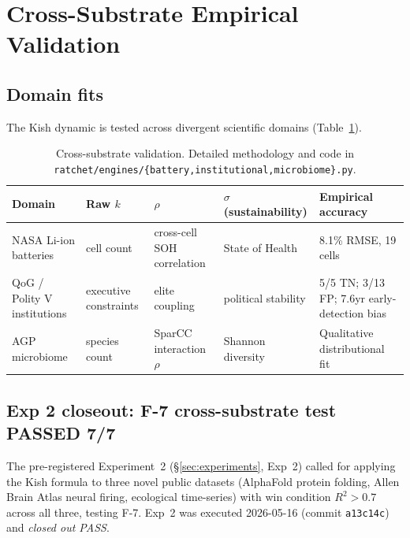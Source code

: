 \documentclass[11pt,a4paper]{article}
\begin{document}
\section{Cross-Substrate Empirical Validation}
\label{sec:substrate}

\subsection{Domain fits}
The Kish dynamic is tested across divergent scientific domains (Table~\ref{tab:domains}).

\begin{table}[h]
\centering
\small
\begin{tabular}{p{2.8cm}p{2.4cm}p{2.4cm}p{2.4cm}p{2.8cm}}
\toprule
\textbf{Domain} & \textbf{Raw $k$} & \textbf{$\rho$} & \textbf{$\sigma$ (sustainability)} & \textbf{Empirical accuracy} \\
\midrule
NASA Li-ion batteries & cell count & cross-cell SOH correlation & State of Health & 8.1\% RMSE, 19 cells \\
QoG / Polity V institutions & executive constraints & elite coupling & political stability & 5/5 TN; 3/13 FP; 7.6yr early-detection bias \\
AGP microbiome & species count & SparCC interaction $\rho$ & Shannon diversity & Qualitative distributional fit \\
\bottomrule
\end{tabular}
\caption{Cross-substrate validation. Detailed methodology and code in \texttt{ratchet/engines/\{battery,institutional,microbiome\}.py}.}
\label{tab:domains}
\end{table}

\subsection{Exp 2 closeout: F-7 cross-substrate test PASSED 7/7}
\label{sec:exp2-closeout}

The pre-registered Experiment~2 (\S\ref{sec:experiments}, Exp~2) called for applying the Kish formula to three novel public datasets (AlphaFold protein folding, Allen Brain Atlas neural firing, ecological time-series) with win condition $R^2 > 0.7$ across all three, testing F-7. Exp~2 was executed 2026-05-16 (commit \texttt{a13c14c}) and \emph{closed out PASS}.
\end{document}
